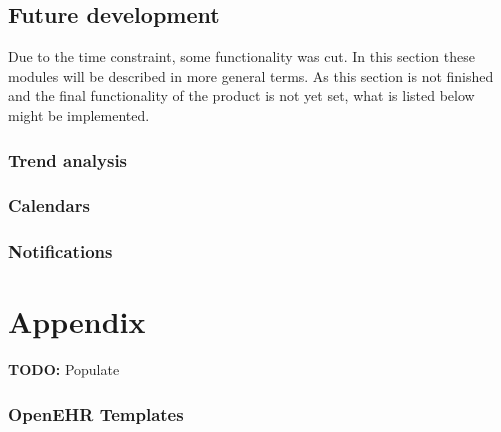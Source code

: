 \documentclass{article}
\begin{document}
\subsection{Future development}
Due to the time constraint, some functionality was cut. In this section these modules will be described in more general terms. As this section is not finished and the final functionality of the product is not yet set, what is listed below might be implemented.
\subsubsection{Trend analysis}
\subsubsection{Calendars}
\subsubsection{Notifications}

\section{Appendix}
\textbf{TODO:} Populate
\subsubsection{OpenEHR Templates}
\end{document}

